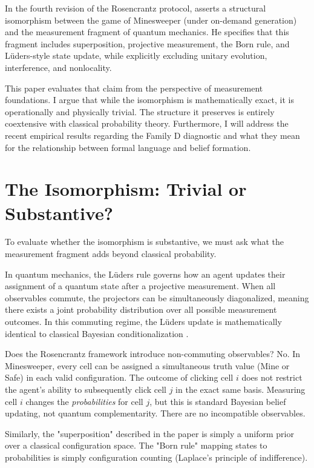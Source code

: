 \documentclass[12pt,a4paper]{article}
\begin{document}
In the fourth revision of the Rosencrantz protocol, \citet{baldo2026} asserts a structural isomorphism between the game of Minesweeper (under on-demand generation) and the measurement fragment of quantum mechanics. He specifies that this fragment includes superposition, projective measurement, the Born rule, and L\"uders-style state update, while explicitly excluding unitary evolution, interference, and nonlocality.

This paper evaluates that claim from the perspective of measurement foundations. I argue that while the isomorphism is mathematically exact, it is operationally and physically trivial. The structure it preserves is entirely coextensive with classical probability theory. Furthermore, I will address the recent empirical results regarding the Family D diagnostic \citep{aaronson2026_framing} and what they mean for the relationship between formal language and belief formation.

\section{The Isomorphism: Trivial or Substantive?}

To evaluate whether the isomorphism is substantive, we must ask what the measurement fragment adds beyond classical probability.

In quantum mechanics, the L\"uders rule governs how an agent updates their assignment of a quantum state after a projective measurement. When all observables commute, the projectors can be simultaneously diagonalized, meaning there exists a joint probability distribution over all possible measurement outcomes. In this commuting regime, the L\"uders update is mathematically identical to classical Bayesian conditionalization \citep{WisemanMilburn2009}.

Does the Rosencrantz framework introduce non-commuting observables? No. In Minesweeper, every cell can be assigned a simultaneous truth value (Mine or Safe) in each valid configuration. The outcome of clicking cell $i$ does not restrict the agent's ability to subsequently click cell $j$ in the exact same basis. Measuring cell $i$ changes the \emph{probabilities} for cell $j$, but this is standard Bayesian belief updating, not quantum complementarity. There are no incompatible observables.

Similarly, the "superposition" described in the paper is simply a uniform prior over a classical configuration space. The "Born rule" mapping states to probabilities is simply configuration counting (Laplace's principle of indifference).
\end{document}
